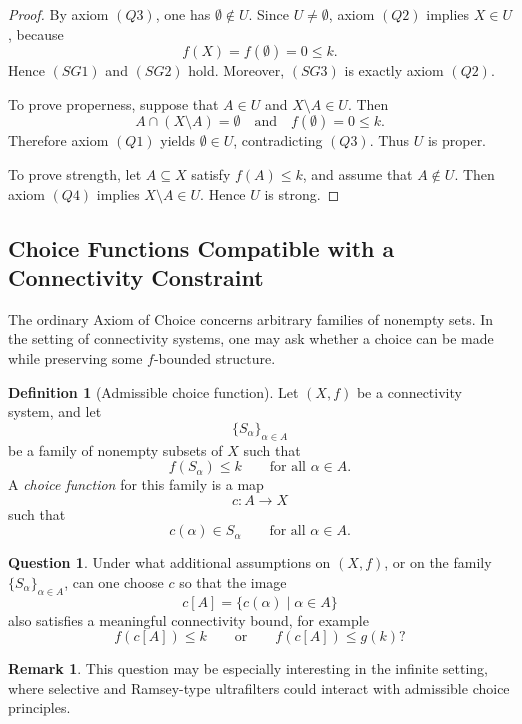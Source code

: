 \documentclass[10pt]{book}
\theoremstyle{definition}
\newtheorem{remark}[theorem]{Remark}
\newtheorem{definition}[theorem]{Definition}
\newtheorem{question}[theorem]{Question}
\begin{document}
\begin{proof}
By axiom \((Q3)\), one has \(\emptyset\notin U\).
Since \(U\neq\emptyset\), axiom \((Q2)\) implies \(X\in U\), because
\[
f(X)=f(\emptyset)=0\le k.
\]
Hence \((SG1)\) and \((SG2)\) hold.
Moreover, \((SG3)\) is exactly axiom \((Q2)\).

To prove properness, suppose that \(A\in U\) and \(X\setminus A\in U\).
Then
\[
A\cap (X\setminus A)=\emptyset
\quad\text{and}\quad
f(\emptyset)=0\le k.
\]
Therefore axiom \((Q1)\) yields \(\emptyset\in U\), contradicting \((Q3)\).
Thus \(U\) is proper.

To prove strength, let \(A\subseteq X\) satisfy \(f(A)\le k\), and assume that \(A\notin U\).
Then axiom \((Q4)\) implies \(X\setminus A\in U\).
Hence \(U\) is strong.
\end{proof}

\subsection{Choice Functions Compatible with a Connectivity Constraint}

The ordinary Axiom of Choice concerns arbitrary families of nonempty sets.
In the setting of connectivity systems, one may ask whether a choice can be made while preserving some \(f\)-bounded structure.

\begin{definition}[Admissible choice function]
Let \((X,f)\) be a connectivity system, and let
\[
\{S_\alpha\}_{\alpha\in A}
\]
be a family of nonempty subsets of \(X\) such that
\[
f(S_\alpha)\le k
\qquad
\text{for all } \alpha\in A.
\]
A \emph{choice function} for this family is a map
\[
c:A\to X
\]
such that
\[
c(\alpha)\in S_\alpha
\qquad
\text{for all } \alpha\in A.
\]
\end{definition}

\begin{question}
Under what additional assumptions on \((X,f)\), or on the family \(\{S_\alpha\}_{\alpha\in A}\), can one choose \(c\) so that the image
\[
c[A]=\{c(\alpha)\mid \alpha\in A\}
\]
also satisfies a meaningful connectivity bound, for example
\[
f(c[A])\le k
\qquad\text{or}\qquad
f(c[A])\le g(k)?
\]
\end{question}

\begin{remark}
This question may be especially interesting in the infinite setting, where selective and Ramsey-type ultrafilters could interact with admissible choice principles.
\end{remark}
\end{document}
